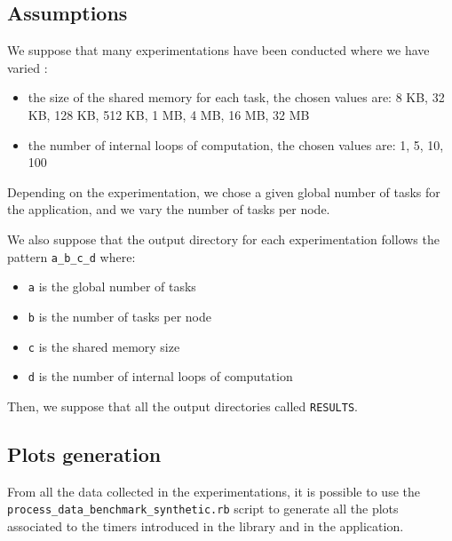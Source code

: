 \documentclass[10pt]{article}
\begin{document}
\subsection{Assumptions}
We suppose that many experimentations have been conducted where we have
varied :
\begin{itemize}
\item the size of the shared memory for each task, the chosen values
  are: 8 KB, 32 KB, 128 KB, 512 KB, 1 MB, 4 MB, 16 MB, 32 MB
\item the number of internal loops of computation, the chosen values
  are: 1, 5, 10, 100
\end{itemize}
Depending on the experimentation, we chose a given global number of
tasks for the application, and we vary the number of tasks per node.

We also suppose that the output directory for each experimentation
follows the pattern \texttt{a\_b\_c\_d} where:
\begin{itemize}
\item \texttt{a} is the global number of tasks
\item \texttt{b} is the number of tasks per node
\item \texttt{c} is the shared memory size
\item \texttt{d} is the number of internal loops of computation
\end{itemize}

Then, we suppose that all the output directories called
\texttt{RESULTS}.

\subsection{Plots generation}
From all the data collected in the experimentations, it is possible to
use the \texttt{process\_data\_benchmark\_synthetic.rb} script to
generate all the plots associated to the timers introduced in the
library and in the application.
\end{document}
